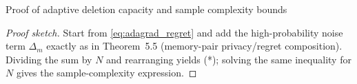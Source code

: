 \documentclass[a4paper,12pt]{article}
\begin{document}
Proof of adaptive deletion capacity and sample complexity bounds

\begin{proof}[Proof sketch]
Start from \eqref{eq:adagrad_regret} and add the high-probability
noise term $\Delta_m$ exactly as in Theorem~5.5
(memory-pair privacy/regret composition).
Dividing the sum by $N$ and rearranging yields (*);
solving the same inequality for $N$ gives the sample-complexity
expression.
\end{proof}

\printbibliography
\end{document}
